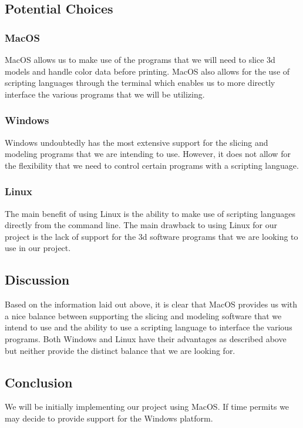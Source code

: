 \documentclass[letterpaper, onecolumn, draftclsnofoot, 10pt, compsoc]{IEEEtran}
\begin{document}
\subsection{Potential Choices}
\subsubsection{MacOS}
	\begin{singlespace}
	MacOS allows us to make use of the programs that we will need to slice 3d models and handle color data before printing. MacOS also allows for the use of scripting languages through the terminal which enables us to more directly interface the various programs that we will be utilizing.
	\end{singlespace}
\subsubsection{Windows}
	\begin{singlespace}
	Windows undoubtedly has the most extensive support for the slicing and modeling programs that we are intending to use. However, it does not allow for the flexibility that we need to control certain programs with a scripting language. 
	\end{singlespace}
\subsubsection{Linux}
	\begin{singlespace}
	The main benefit of using Linux is the ability to make use of scripting languages directly from the command line. The main drawback to using Linux for our project is the lack of support for the 3d software programs that we are looking to use in our project. 
	\end{singlespace}
\subsection{Discussion}
	\begin{singlespace}
    Based on the information laid out above, it is clear that MacOS provides us with a nice balance between supporting the slicing and modeling software that we intend to use and the ability to use a scripting language to interface the various programs. Both Windows and Linux have their advantages as described above but neither provide the distinct balance that we are looking for.
	\end{singlespace}
\subsection{Conclusion}
	\begin{singlespace}
	We will be initially implementing our project using MacOS. If time permits we may decide to provide support for the Windows platform. 
	\end{singlespace}
\end{document}
